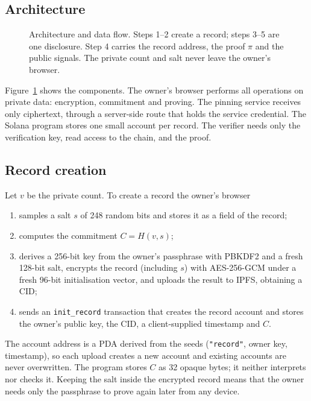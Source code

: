 \subsection{Architecture}

\begin{figure}[t]
\centering

\caption{Architecture and data flow. Steps 1--2 create a record; steps 3--5
are one disclosure. Step 4 carries the record address, the proof $\pi$ and
the public signals. The private count and salt never leave the owner's
browser.}
\label{fig:arch}
\end{figure}

Figure~\ref{fig:arch} shows the components. The owner's browser performs all
operations on private data: encryption, commitment and proving. The pinning
service receives only ciphertext, through a server-side route that holds the
service credential. The Solana program stores one small account per record.
The verifier needs only the verification key, read access to the chain, and
the proof.

\subsection{Record creation}

Let $v$ be the private count. To create a record the owner's browser
\begin{enumerate}
  \item samples a salt $s$ of 248 random bits and stores it as a field of
  the record;
  \item computes the commitment $C = H(v, s)$;
  \item derives a 256-bit key from the owner's passphrase with PBKDF2 and a
  fresh 128-bit salt, encrypts the record (including $s$) with AES-256-GCM
  under a fresh 96-bit initialisation vector, and uploads the result to
  IPFS, obtaining a CID;
  \item sends an \texttt{init\_record} transaction that creates the record
  account and stores the owner's public key, the CID, a client-supplied
  timestamp and $C$.
\end{enumerate}
The account address is a PDA derived from the seeds
(\texttt{"record"}, owner key, timestamp), so each upload creates a new
account and existing accounts are never overwritten. The program stores $C$
as 32 opaque bytes; it neither interprets nor checks it. Keeping the salt
inside the encrypted record means that the owner needs only the passphrase
to prove again later from any device.

